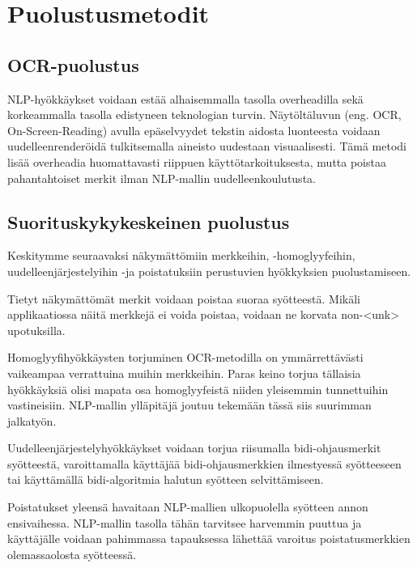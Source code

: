 \chapter{Puolustusmetodit\label{discussion}}
\section{OCR-puolustus}
NLP-hyökkäykset voidaan estää alhaisemmalla tasolla overheadilla sekä korkeammalla tasolla edistyneen teknologian turvin. Näytöltäluvun (eng. OCR, On-Screen-Reading) avulla epäselvyydet tekstin aidosta luonteesta voidaan uudelleenrenderöidä tulkitsemalla aineisto uudestaan visuaalisesti. Tämä metodi lisää overheadia huomattavasti riippuen käyttötarkoituksesta, mutta poistaa pahantahtoiset merkit ilman NLP-mallin uudelleenkoulutusta.

\section{Suorituskykykeskeinen puolustus}
Keskitymme seuraavaksi näkymättömiin merkkeihin, -homoglyyfeihin, \-uudelleenjärjestelyihin -ja poistatuksiin perustuvien hyökkyksien puolustamiseen.

Tietyt näkymättömät merkit voidaan poistaa suoraa syötteestä. Mikäli applikaatiossa näitä merkkejä ei voida poistaa, voidaan ne korvata non-<unk> upotuksilla.

Homoglyyfihyökkäysten torjuminen OCR-metodilla on ymmärrettävästi vaikeampaa verrattuina muihin merkkeihin. Paras keino torjua tällaisia hyökkäyksiä olisi mapata osa homoglyyfeistä niiden yleisemmin tunnettuihin vastineisiin. NLP-mallin ylläpitäjä joutuu tekemään tässä siis suurimman jalkatyön.

Uudelleenjärjestelyhyökkäykset voidaan torjua riisumalla bidi-ohjausmerkit syötteestä, varoittamalla käyttäjää bidi-ohjausmerkkien ilmestyessä syötteeseen tai käyttämällä bidi-algoritmia halutun syötteen selvittämiseen.

Poistatukset yleensä havaitaan NLP-mallien ulkopuolella syötteen annon ensivaihessa. NLP-mallin tasolla tähän tarvitsee harvemmin puuttua ja käyttäjälle voidaan pahimmassa tapauksessa lähettää varoitus poistatusmerkkien olemassaolosta syötteessä.